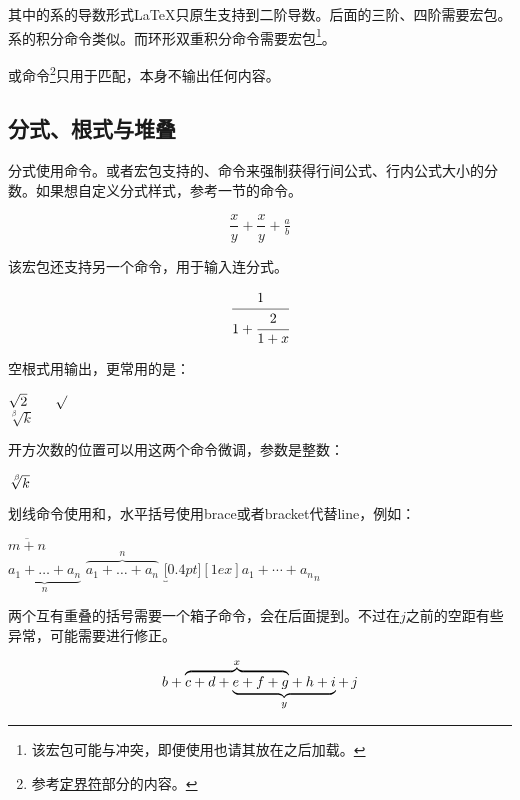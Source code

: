 其中的系的导数形式\LaTeX 只原生支持到二阶导数。后面的三阶、四阶需要宏包。系的积分命令类似。而环形双重积分命令需要宏包\footnote{该宏包可能与冲突，即便使用也请其放在之后加载。}。

或命令\footnote{参考\hyperref[subsec:delimiter]{定界符}部分的内容。}只用于匹配，本身不输出任何内容。

\subsection{分式、根式与堆叠}
分式使用命令。或者宏包支持的、命令来强制获得行间公式、行内公式大小的分数。如果想自定义分式样式，参考一节的命令。
\begin{codeshow}
\[\frac{x}{y}+\dfrac{x}{y}
+\tfrac{a}{b}\]
\end{codeshow}

该宏包还支持另一个命令，用于输入连分式。
\begin{codeshow}
\[\cfrac{1}{1+\cfrac{2}{1+x}}\]
\end{codeshow}

空根式用输出，更常用的是：
\begin{codeshow}
$\sqrt{2} \qquad \surd$\\
$\sqrt[\beta]{k}$
\end{codeshow}

开方次数的位置可以用这两个命令微调，参数是整数：
\begin{codeshow}
$\sqrt[\leftroot{-2}\uproot{2} \beta]{k}$
\end{codeshow}

划线命令使用和，水平括号使用brace或者bracket代替line，例如：

\begin{codeshow}
$\overline{m+n}$ \\
$\underbrace{a_1+\ldots+a_n}_{n}$
$\overbrace{a_1+\ldots+a_n}^{n}$
$\underbracket[0.4pt][1ex]
  {a_1+\cdots+a_n}_n$
\end{codeshow}

两个互有重叠的括号需要一个箱子命令，会在后面提到。不过在$j$之前的空距有些异常，可能需要\latexline{,}进行修正。
\begin{codeshow}
\[b+\rlap{$\overbrace{\phantom{
  c+d+e+f+g}}^x$}c+d+\underbrace{
  e+f+g+h+i}_y+\,j \]
\end{codeshow}

